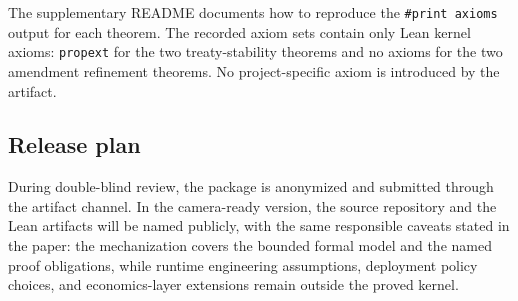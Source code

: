 The supplementary README documents how to reproduce the
\texttt{\#print axioms} output for each theorem. The recorded axiom
sets contain only Lean kernel axioms: \texttt{propext} for the two
treaty-stability theorems and no axioms for the two amendment
refinement theorems. No project-specific axiom is introduced by the
artifact.

\subsection{Release plan}
\label{sec:open-science:release}

During double-blind review, the package is anonymized and submitted
through the artifact channel. In the camera-ready version, the source
repository and the Lean artifacts will be named publicly, with the same
responsible caveats stated in the paper: the mechanization covers the
bounded formal model and the named proof obligations, while runtime
engineering assumptions, deployment policy choices, and economics-layer
extensions remain outside the proved kernel.
